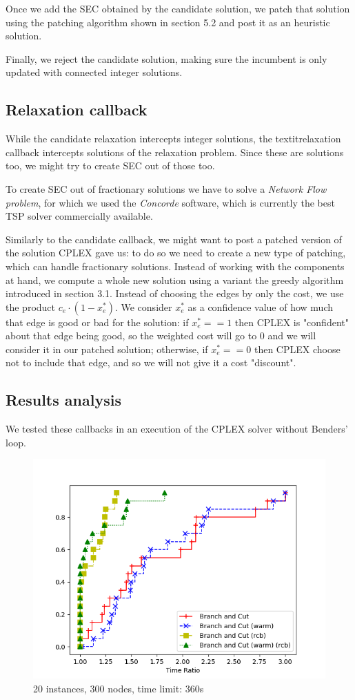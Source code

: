 Once we add the SEC obtained by the candidate solution, we patch that solution using the patching algorithm shown in section 5.2 and post it as an heuristic solution.

Finally, we reject the candidate solution, making sure the incumbent is only updated with connected integer solutions.

\subsection{Relaxation callback}
While the candidate relaxation intercepts integer solutions, the textit{relaxation callback} intercepts solutions of the relaxation problem. Since these are solutions too, we might try to create SEC out of those too.

To create SEC out of fractionary solutions we have to solve a \textit{Network Flow problem}, for which we used the \textit{Concorde} software, which is currently the best TSP solver commercially available.

Similarly to the candidate callback, we might want to post a patched version of the solution CPLEX gave us: to do so we need to create a new type of patching, which can handle fractionary solutions. Instead of working with the components at hand, we compute a whole new solution using a variant the greedy algorithm introduced in section 3.1. Instead of choosing the edges by only the cost, we use the product $c_e \cdot (1 - x^*_e)$. We consider $x^*_e$ as a confidence value of how much that edge is good or bad for the solution: if $x^*_e == 1$ then CPLEX is "confident" about that edge being good, so the weighted cost will go to 0 and we will consider it in our patched solution; otherwise, if $x^*_e == 0$ then CPLEX choose not to include that edge, and so we will not give it a cost "discount".

\subsection{Results analysis}

We tested these callbacks in an execution of the CPLEX solver without Benders' loop.

\FloatBarrier
\begin{figure}[h]
    \centering
    \includegraphics*[width=.6\textwidth]{../plots/perfprof_bnc_times.png}
    \caption*{20 instances, 300 nodes, time limit: 360s}
\end{figure}
\FloatBarrier

